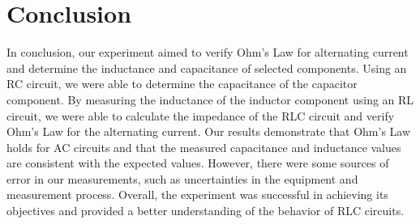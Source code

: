 \section{Conclusion}

In conclusion, our experiment aimed to verify Ohm's Law for alternating current and determine the inductance and capacitance of selected components. Using an RC circuit, we were able to determine the capacitance of the capacitor component. By measuring the inductance of the inductor component using an RL circuit, we were able to calculate the impedance of the RLC circuit and verify Ohm's Law for the alternating current. Our results demonstrate that Ohm's Law holds for AC circuits and that the measured capacitance and inductance values are consistent with the expected values. However, there were some sources of error in our measurements, such as uncertainties in the equipment and measurement process. Overall, the experiment was successful in achieving its objectives and provided a better understanding of the behavior of RLC circuits. 